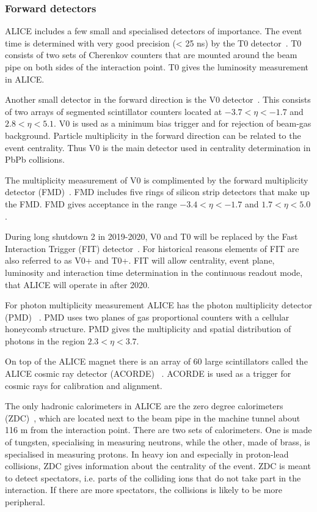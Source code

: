 \subsubsection{Forward detectors}
ALICE includes a few small and specialised detectors of importance. The event time is determined with very good precision (< 25 ns) by the T0 detector~\cite{T0}. T0 consists of two sets of Cherenkov counters that are mounted around the beam pipe on both sides of the interaction point. T0 gives the luminosity measurement in ALICE.

Another small detector in the forward direction is the V0 detector~\cite{V0}. This consists of two arrays of segmented scintillator counters located at $-3.7 < \eta < -1.7$ and $ 2.8 < \eta < 5.1$. V0 is used as a minimum bias trigger and for rejection of beam-gas background. Particle multiplicity in the forward direction can be related to the event centrality. Thus V0 is the main detector used in centrality determination in PbPb collisions.

The multiplicity measurement of V0 is complimented by the forward multiplicity detector (FMD)~\cite{FMD}. FMD includes five rings of silicon strip detectors that make up the FMD. FMD gives acceptance in the range $-3.4 < \eta < -1.7$ and $ 1.7 < \eta < 5.0$.

During long shutdown 2 in 2019-2020, V0 and T0 will be replaced by the Fast Interaction Trigger (FIT) detector~\cite{FIT}. For historical reasons elements of FIT are also referred to as V0+ and T0+. FIT will allow centrality, event plane, luminosity and interaction time determination in the continuous readout mode, that ALICE will operate in after 2020.

For photon multiplicity measurement ALICE has the photon multiplicity detector (PMD) ~\cite{PMD}. PMD uses two planes of gas proportional counters with a cellular honeycomb structure. PMD gives the multiplicity and spatial distribution of photons in the region $2.3 < \eta < 3.7$.

On top of the ALICE magnet there is an array of 60 large scintillators called the ALICE cosmic ray detector (ACORDE) ~\cite{acorde}. ACORDE is used as a trigger for cosmic rays for calibration and alignment. 

The only hadronic calorimeters in ALICE are the zero degree calorimeters (ZDC)~\cite{zdc}, which are located next to the beam pipe in the machine tunnel about 116 m from the interaction point. There are two sets of calorimeters. One is made of tungsten, specialising in measuring neutrons, while the other, made of brass, is specialised in measuring protons. In heavy ion and especially in proton-lead collisions, ZDC gives information about the centrality of the event. ZDC is meant to detect spectators, i.e. parts of the colliding ions that do not take part in the interaction. If there are more spectators, the collisions is likely to be more peripheral.

